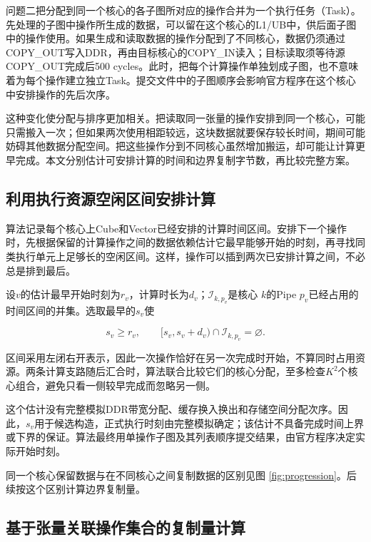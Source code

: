 \documentclass[anonymous,notoc]{gmcm2026}
\begin{document}
问题二把分配到同一个核心的各子图所对应的操作合并为一个执行任务（Task）。先处理的子图中操作所生成的数据，可以留在这个核心的L1/UB中，供后面子图中的操作使用。如果生成和读取数据的操作分配到了不同核心，数据仍须通过COPY\_OUT写入DDR，再由目标核心的COPY\_IN读入；目标读取须等待源COPY\_OUT完成后500 cycles。此时，把每个计算操作单独划成子图，也不意味着为每个操作建立独立Task。提交文件中的子图顺序会影响官方程序在这个核心中安排操作的先后次序。

这种变化使分配与排序更加相关。把读取同一张量的操作安排到同一个核心，可能只需搬入一次；但如果两次使用相距较远，这块数据就要保存较长时间，期间可能妨碍其他数据分配空间。把这些操作分到不同核心虽然增加搬运，却可能让计算更早完成。本文分别估计可安排计算的时间和边界复制字节数，再比较完整方案。

\subsection{利用执行资源空闲区间安排计算}

算法记录每个核心上Cube和Vector已经安排的计算时间区间。安排下一个操作时，先根据保留的计算操作之间的数据依赖估计它最早能够开始的时刻，再寻找同类执行单元上足够长的空闲区间。这样，操作可以插到两次已安排计算之间，不必总是排到最后。

设\(v\)的估计最早开始时刻为\(r_v\)，计算时长为\(d_v\)；\(\mathcal I_{k,p_v}\)是核心 \(k\)的Pipe \(p_v\)已经占用的时间区间的并集。选取最早的\(s_v\)使

\begin{equation}
s_v\ge r_v,\qquad [s_v,s_v+d_v)\cap\mathcal I_{k,p_v}=\varnothing.
\end{equation}

区间采用左闭右开表示，因此一次操作恰好在另一次完成时开始，不算同时占用资源。两条计算支路随后汇合时，算法联合比较它们的核心分配，至多检查\(K^2\)个核心组合，避免只看一侧较早完成而忽略另一侧。

这个估计没有完整模拟DDR带宽分配、缓存换入换出和存储空间分配次序。因此，\(s_v\)用于候选构造，正式执行时刻由完整模拟确定；该估计不具备完成时间上界或下界的保证。算法最终用单操作子图及其列表顺序提交结果，由官方程序决定实际开始时刻。

同一个核心保留数据与在不同核心之间复制数据的区别见图 \ref{fig:progression}。后续按这个区别计算边界复制量。

\subsection{基于张量关联操作集合的复制量计算}
\end{document}
